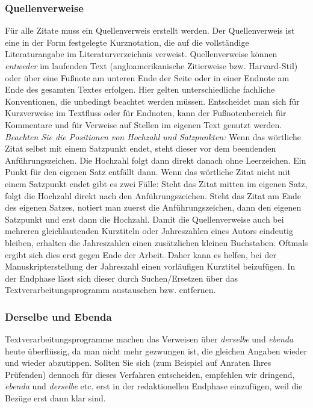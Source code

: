\documentclass[a4paper,11pt]{article}%
\renewcommand{\\}{\vspace*{0.5\baselineskip} \newline}
\begin{document}
\subsubsection{Quellenverweise}
Für alle Zitate muss ein Quellenverweis erstellt werden. Der Quellenverweis ist eine in der Form festgelegte Kurznotation, die auf die vollständige Literaturangabe im Literaturverzeichnis verweist. Quellenverweise können \textit{entweder} im laufenden Text (angloamerikanische Zitierweise bzw. Harvard-Stil) oder über eine Fußnote am unteren Ende der Seite oder in einer Endnote am Ende des gesamten Textes erfolgen. Hier gelten unterschiedliche fachliche Konventionen, die unbedingt beachtet werden müssen.\\
Entscheidet man sich für Kurzverweise im Textfluss oder für Endnoten, kann der Fußnotenbereich für Kommentare und für Verweise auf Stellen im eigenen Text genutzt werden.\\
\textit{Beachten Sie die Positionen von Hochzahl und Satzpunkten:}\\ 
Wenn das wörtliche Zitat selbst mit einem Satzpunkt endet, steht dieser vor dem beendenden Anführungszeichen. Die Hochzahl folgt dann direkt danach ohne Leerzeichen. Ein Punkt für den eigenen Satz entfällt dann.\\
Wenn das wörtliche Zitat nicht mit einem Satzpunkt endet gibt es zwei Fälle: Steht das Zitat mitten im eigenen Satz, folgt die Hochzahl direkt nach den Anführungszeichen.\\
Steht das Zitat am Ende des eigenen Satzes, notiert man zuerst die Anführungszeichen, dann den eigenen Satzpunkt und erst dann die Hochzahl.\\
Damit die Quellenverweise auch bei mehreren gleichlautenden Kurztiteln oder Jahreszahlen eines Autors eindeutig bleiben, erhalten die Jahreszahlen einen zusätzlichen kleinen Buchstaben. Oftmals ergibt sich dies erst gegen Ende der Arbeit. Daher kann es helfen, bei der Manuskripterstellung der Jahreszahl einen vorläufigen Kurztitel beizufügen. In der Endphase lässt sich dieser durch Suchen/Ersetzen über das Textverarbeitungsprogramm austauschen bzw. entfernen.

\subsubsection{Derselbe und Ebenda}
Textverarbeitungsprogramme machen das Verweisen über \textit{derselbe} und \textit{ebenda} heute überflüssig, da man nicht mehr gezwungen ist, die gleichen Angaben wieder und wieder abzutippen. Sollten Sie sich (zum Beispiel auf Anraten Ihres Prüfenden) dennoch für dieses Verfahren entscheiden, empfehlen wir dringend, \textit{ebenda} und \textit{derselbe} etc. erst in der redaktionellen Endphase einzufügen, weil die Bezüge erst dann klar sind. 
\end{document}
